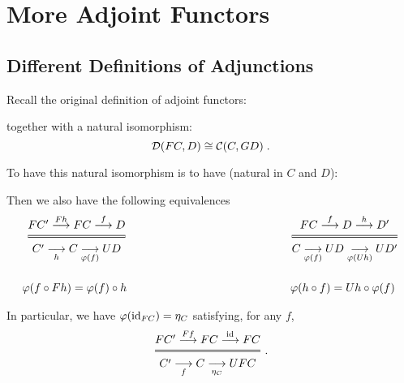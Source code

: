 \chapter{More Adjoint Functors}

\section{Different Definitions of Adjunctions}

Recall the original definition of adjoint functors:

 \begin{center}
\end{center}
together with a natural isomorphism:
\begin{equation*}
\mathcal{D}(F C, D) \cong 
  \mathcal{C}(C, G D) \;.
\end{equation*}

To have this natural isomorphism is to have (natural in $C$ and $D$):
\begin{center}
\end{center}

Then we also have the following equivalences
\begin{align*}
  \Efrac{F C' \overset{Fh}\longrightarrow F C \overset{f}\longrightarrow D}
  {C' \underset{h}\longrightarrow C \underset{\varphi(f)}\longrightarrow UD}
  &\hspace{2in}
  \Efrac{F C \overset{f}\longrightarrow D \overset{h}\longrightarrow D'}
    {C \underset{\varphi(f)}\longrightarrow UD \underset{\varphi(U h)}\longrightarrow UD'}
  \\\\
  \varphi(f \comp F h) = \varphi(f) \comp h
  &\hspace{2in}
    \varphi(h \comp f) = Uh \comp \varphi(f)
\end{align*}

In particular, we have $\varphi(\mathrm{id}_{ FC }) = \eta_C$ satisfying, for any $f$,
\begin{equation*}
  \Efrac{FC' \overset{F f}\longrightarrow FC \overset{\id{}}\longrightarrow FC}
  {C' \underset{f}\longrightarrow C \underset{\eta_C}\longrightarrow UFC}\;.
\end{equation*} 

